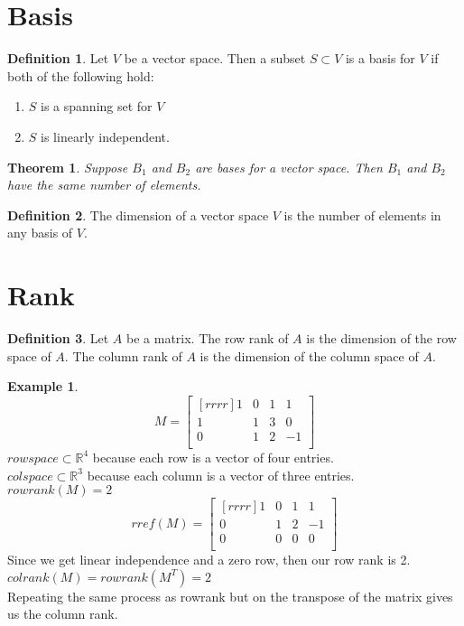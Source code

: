 \documentclass{report}
\theoremstyle{plain}
\newtheorem*{thrm}{Theorem}
\theoremstyle{definition}
\newtheorem*{ex}{Example}
\newtheorem*{defn}{Definition}
\theoremstyle{plain}
\begin{document}
\section{Basis}
\begin{defn}
Let $V$ be a vector space. Then a subset $S\subset V$ is a basis for $V$ if both of the following hold:
	\begin{enumerate}
	\item $S$ is a spanning set for $V$
	\item $S$ is linearly independent.
	\end{enumerate}
\end{defn}
\begin{thrm}
Suppose $B_1$ and $B_2$ are bases for a vector space. Then $B_1$ and $B_2$ have the same number of elements.
\end{thrm}
\begin{defn}
The dimension of a vector space $V$ is the number of elements in any basis of $V$.
\end{defn}

\section{Rank}
\begin{defn}
Let $A$ be a matrix. The row rank of $A$ is the dimension of the row space of $A$. The column rank of $A$ is the dimension of the column space of $A$.
\end{defn}
\begin{ex}
\[ M=\begin{bmatrix}[rrrr]1&0&1&1\\1&1&3&0\\0&1&2&-1\\\end{bmatrix} \]
$rowspace \subset \mathbb{R}^4$ because each row is a vector of four entries.\\
$colspace \subset \mathbb{R}^3$ because each column is a vector of three entries.\\
$rowrank(M)=2$
\[ rref(M)=\begin{bmatrix}[rrrr]1&0&1&1\\0&1&2&-1\\0&0&0&0\\\end{bmatrix} \]
Since we get linear independence and a zero row, then our row rank is 2.\\
$colrank(M)=rowrank(M^T)=2$\\
Repeating the same process as rowrank but on the transpose of the matrix gives us the column rank.
\end{ex}
\end{document}
